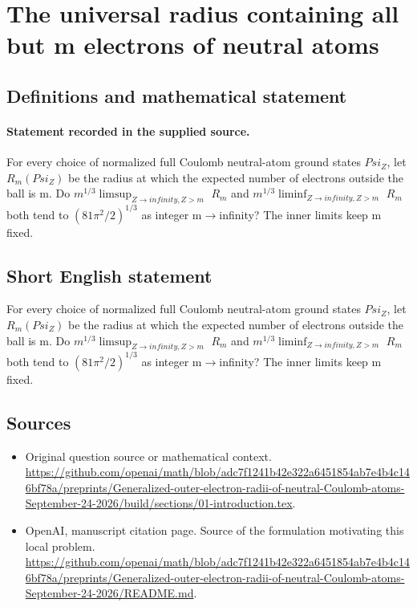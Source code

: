 \documentclass[11pt]{article}
\begin{document}
\section*{The universal radius containing all but m electrons of neutral atoms}\label{30007241}
\subsection{Definitions and mathematical statement}
\paragraph{Statement recorded in the supplied source.}
For every choice of normalized full Coulomb neutral-atom ground states $Psi_Z$, let $R_m(Psi_Z)$ be the radius at which the expected number of electrons outside the ball is m. Do $m^{1/3}\limsup _{Z\to infinity,Z>m}$ $R_m$ and $m^{1/3}\liminf _{Z\to infinity,Z>m}$ $R_m$ both tend to $(81\pi ^2/2)^{1/3}$ as integer m$\to$infinity? The inner limits keep m fixed.
\subsection{Short English statement}
For every choice of normalized full Coulomb neutral-atom ground states $Psi_Z$, let $R_m(Psi_Z)$ be the radius at which the expected number of electrons outside the ball is m. Do $m^{1/3}\limsup _{Z\to infinity,Z>m}$ $R_m$ and $m^{1/3}\liminf _{Z\to infinity,Z>m}$ $R_m$ both tend to $(81\pi ^2/2)^{1/3}$ as integer m$\to$infinity? The inner limits keep m fixed.
\subsection{Sources}
\begin{itemize}
\item[S1] Original question source or mathematical context.
\url{https://github.com/openai/math/blob/adc7f1241b42e322a6451854ab7e4b4c146bf78a/preprints/Generalized-outer-electron-radii-of-neutral-Coulomb-atoms-September-24-2026/build/sections/01-introduction.tex}.
\item[S2] OpenAI, manuscript citation page. Source of the formulation motivating this local problem.
\url{https://github.com/openai/math/blob/adc7f1241b42e322a6451854ab7e4b4c146bf78a/preprints/Generalized-outer-electron-radii-of-neutral-Coulomb-atoms-September-24-2026/README.md}.
\end{itemize}
\end{document}
